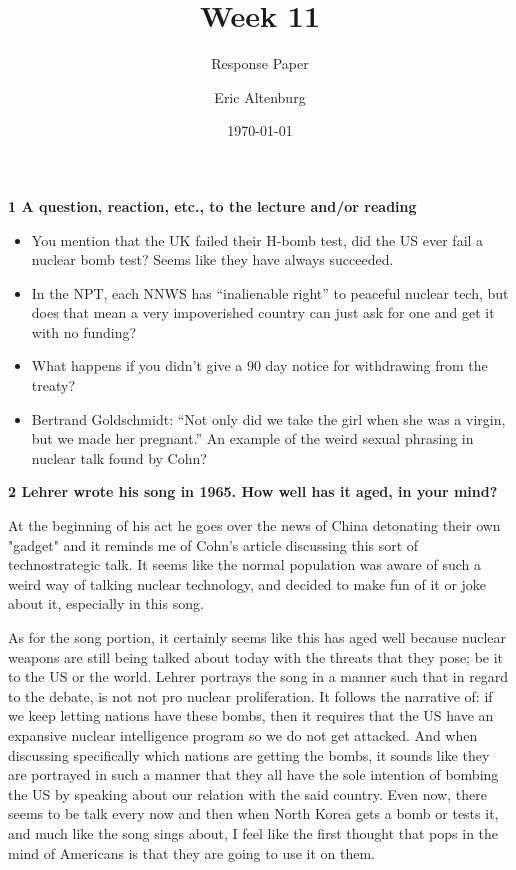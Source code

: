 \documentclass[12pt]{turabian-researchpaper}
\title{Week 11}
\subtitle{Response Paper}
\author{Eric Altenburg}
\date{\today}
\newcommand\question[2]{\noindent\textbf{#1 \quad #2}}
\begin{document}
\maketitle

\question{1}{A question, reaction, etc., to the lecture and/or reading}

	\begin{itemize}
		\item You mention that the UK failed their H-bomb test, did the US ever fail a nuclear bomb test? Seems like they have always succeeded.
		\item In the NPT, each NNWS has “inalienable right” to peaceful nuclear tech, but does that mean a very impoverished country can just ask for one and get it with no funding?
		\item What happens if you didn’t give a 90 day notice for withdrawing from the treaty?
		\item Bertrand Goldschmidt: “Not only did we take the girl when she was a virgin, but we made her pregnant.” An example of the weird sexual phrasing in nuclear talk found by Cohn?
	\end{itemize}

\question{2}{Lehrer wrote his song in 1965. How well has it aged, in your mind?}

	At the beginning of his act he goes over the news of China detonating their own "gadget" and it reminds me of Cohn's article discussing this sort of technostrategic talk. It seems like the normal population was aware of such a weird way of talking nuclear technology, and decided to make fun of it or joke about it, especially in this song.

	As for the song portion, it certainly seems like this has aged well because nuclear weapons are still being talked about today with the threats that they pose; be it to the US or the world. Lehrer portrays the song in a manner such that in regard to the debate, is not not pro nuclear proliferation. It follows the narrative of: if we keep letting nations have these bombs, then it requires that the US have an expansive nuclear intelligence program so we do not get attacked. And when discussing specifically which nations are getting the bombs, it sounds like they are portrayed in such a manner that they all have the sole intention of bombing the US by speaking about our relation with the said country. Even now, there seems to be talk every now and then when North Korea gets a bomb or tests it, and much like the song sings about, I feel like the first thought that pops in the mind of Americans is that they are going to use it on them.
\end{document}
